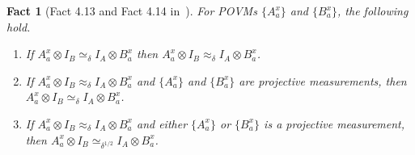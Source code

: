 \documentclass{book}
\theoremstyle{plain}
\newtheorem{fact}[subsection]{Fact}
\theoremstyle{definition}
\theoremstyle{remark}
\numberwithin{equation}{subsection}
\newcommand{\alice}{A}
\newcommand{\bob}{B}
\begin{document}
\begin{fact}[Fact 4.13 and Fact 4.14 in~\cite{NW19}]
  \label{fact:agreement}
  For POVMs $\{A^x_a\}$ and $\{B^x_a\}$, the following hold.
  \begin{enumerate}
  \item If $A^x_a \otimes I_\bob \simeq_\delta I_\alice \otimes B^x_a$ then
    $A^x_a \otimes I_\bob \approx_\delta I_\alice \otimes B^x_a$.
    \label{item:consistency-implies-approx}
  \item If $A^x_a \otimes I_\bob \approx_\delta I_\alice \otimes B^x_a$
    \emph{and} $\{A^x_a\}$ and $\{B^x_a\}$ are projective measurements, then
    $A^x_a \otimes I_\bob \simeq_\delta I_\alice \otimes B^x_a$.
    \label{item:both-projectors-implies-consistency}
  \item If $A^x_a \otimes I_\bob \approx_\delta I_\alice \otimes B^x_a$ and
    either $\{A^x_a\}$ or $\{B^x_a\}$ is a projective measurement, then
    $A^x_a \otimes I_\bob \simeq_{\delta^{1/2}} I_\alice \otimes B^x_a$.
    \label{item:one-projector-implies-consistency}
  \end{enumerate}
\end{fact}
\end{document}
